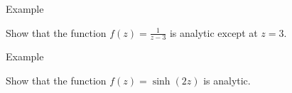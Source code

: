 \documentclass[11pt]{beamer}
\theoremstyle{plain}
\begin{document}
\begin{frame}{Example}
    \begin{example}
        Show that the function $f(z)=\frac{1}{z-3}$ is analytic except at $z=3$.
    \end{example}
\end{frame}

\begin{frame}{Example}
    \begin{example}
        Show that the function $f(z)=\sinh (2z)$ is analytic.
    \end{example}
\end{frame}
\end{document}
